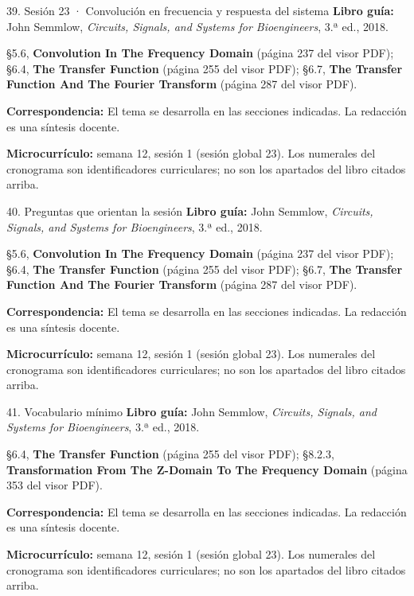 \documentclass[
  10pt,
  ignorenonframetext,
  aspectratio=169,
  spanish,
]{beamer}
\begin{document}
\begin{frame}{39. Sesión 23 · Convolución en frecuencia y respuesta del
sistema}
\label{sesiuxf3n-23-convoluciuxf3n-en-frecuencia-y-respuesta-del-sistema}
\textbf{Libro guía:} John Semmlow, \emph{Circuits, Signals, and Systems
for Bioengineers}, 3.ª ed., 2018.

§5.6, \textbf{Convolution In The Frequency Domain} (página 237 del visor
PDF); §6.4, \textbf{The Transfer Function} (página 255 del visor PDF);
§6.7, \textbf{The Transfer Function And The Fourier Transform} (página
287 del visor PDF).

\textbf{Correspondencia:} El tema se desarrolla en las secciones
indicadas. La redacción es una síntesis docente.

\textbf{Microcurrículo:} semana 12, sesión 1 (sesión global 23). Los
numerales del cronograma son identificadores curriculares; no son los
apartados del libro citados arriba.
\end{frame}

\begin{frame}{40. Preguntas que orientan la sesión}
\label{preguntas-que-orientan-la-sesiuxf3n-2}
\textbf{Libro guía:} John Semmlow, \emph{Circuits, Signals, and Systems
for Bioengineers}, 3.ª ed., 2018.

§5.6, \textbf{Convolution In The Frequency Domain} (página 237 del visor
PDF); §6.4, \textbf{The Transfer Function} (página 255 del visor PDF);
§6.7, \textbf{The Transfer Function And The Fourier Transform} (página
287 del visor PDF).

\textbf{Correspondencia:} El tema se desarrolla en las secciones
indicadas. La redacción es una síntesis docente.

\textbf{Microcurrículo:} semana 12, sesión 1 (sesión global 23). Los
numerales del cronograma son identificadores curriculares; no son los
apartados del libro citados arriba.
\end{frame}

\begin{frame}{41. Vocabulario mínimo}
\label{vocabulario-muxednimo-2}
\textbf{Libro guía:} John Semmlow, \emph{Circuits, Signals, and Systems
for Bioengineers}, 3.ª ed., 2018.

§6.4, \textbf{The Transfer Function} (página 255 del visor PDF); §8.2.3,
\textbf{Transformation From The Z-Domain To The Frequency Domain}
(página 353 del visor PDF).

\textbf{Correspondencia:} El tema se desarrolla en las secciones
indicadas. La redacción es una síntesis docente.

\textbf{Microcurrículo:} semana 12, sesión 1 (sesión global 23). Los
numerales del cronograma son identificadores curriculares; no son los
apartados del libro citados arriba.
\end{frame}
\end{document}
